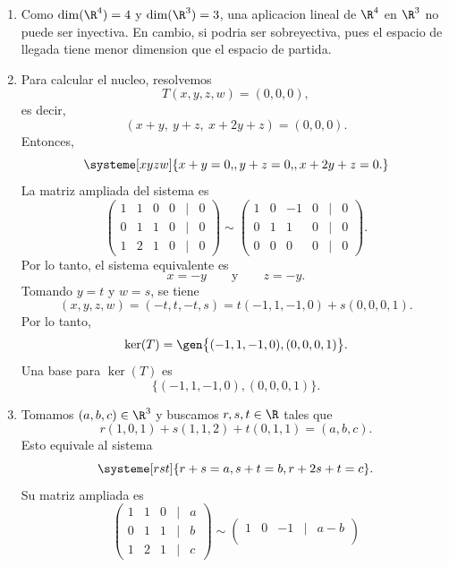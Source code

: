 \documentclass[11pt,respuestas,a4]{aleph-examen}
\begin{document}
\begin{preguntas}
\begin{respuesta}\hspace{0pt}
\begin{enumerate}
\item
    Como $\dim(\R^4)=4$ y $\dim(\R^3)=3$, una aplicacion lineal de $\R^4$ en $\R^3$ no puede ser inyectiva. En cambio, si podria ser sobreyectiva, pues el espacio de llegada tiene menor dimension que el espacio de partida.
\item
    Para calcular el nucleo, resolvemos
    \[
        T(x,y,z,w)=(0,0,0),
    \]
    es decir,
    \[
        (x+y,\ y+z,\ x+2y+z)=(0,0,0).
    \]
    Entonces,
    \[
        \systeme[xyzw]{
            x+y=0{,},
            y+z=0{,},
            x+2y+z=0{.}
        }
    \]
    La matriz ampliada del sistema es
    \[
        \begin{pmatrix}
            1 & 1 & 0 & 0 & | & 0\\
            0 & 1 & 1 & 0 & | & 0\\
            1 & 2 & 1 & 0 & | & 0
        \end{pmatrix}
        \sim
        \begin{pmatrix}
            1 & 0 & -1 & 0 & | & 0\\
            0 & 1 & 1 & 0 & | & 0\\
            0 & 0 & 0 & 0 & | & 0
        \end{pmatrix}.
    \]
    Por lo tanto, el sistema equivalente es
    \[
        x=-y
        \qquad\text{y}\qquad
        z=-y.
    \]
    Tomando $y=t$ y $w=s$, se tiene
    \[
        (x,y,z,w)=(-t,t,-t,s)
        =
        t(-1,1,-1,0)+s(0,0,0,1).
    \]
    Por lo tanto,
    \[
        \ker(T)=
        \gen\big\{(-1,1,-1,0),(0,0,0,1)\big\}.
    \]
    Una base para $\ker(T)$ es
    \[
        \big\{(-1,1,-1,0),(0,0,0,1)\big\}.
    \]
\item
    Tomamos $(a,b,c)\in\R^3$ y buscamos
    $r,s,t\in\R$ tales que
    \[
        r(1,0,1)+s(1,1,2)+t(0,1,1)=(a,b,c).
    \]
    Esto equivale al sistema
    \[
        \systeme[rst]{
            r+s=a,
            s+t=b,
            r+2s+t=c
        }.
    \]
    Su matriz ampliada es
    \[
        \begin{pmatrix}
            1 & 1 & 0 & | & a\\
            0 & 1 & 1 & | & b\\
            1 & 2 & 1 & | & c
        \end{pmatrix}
        \sim
        \begin{pmatrix}
            1 & 0 & -1 & | & a-b\\

\end{pmatrix}\]
\end{enumerate}
\end{respuesta}
\end{preguntas}
\end{document}
